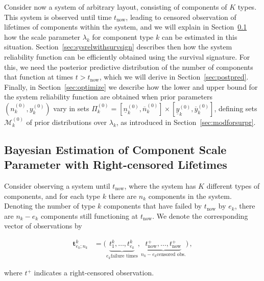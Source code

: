 \documentclass[Journal,SectionNumbers,InsideFigs]{ascelike}
\renewcommand{\vec}[1]{{\bm#1}}
\newcommand{\uz}{^{(0)}} %
\newcommand{\ul}[1]{\underline{#1}}
\newcommand{\ol}[1]{\overline{#1}}
\def\ykz{y\uz_k}
\def\ykzl{\ul{y}\uz_k}
\def\ykzu{\ol{y}\uz_k}
\def\nkz{n\uz_k}
\def\nkzl{\ul{n}\uz_k}
\def\nkzu{\ol{n}\uz_k}
\def\MkZ{\mathcal{M}\uz_k}
\def\PkZ{\Pi\uz_k}
\def\tnow{t_\text{now}}
\def\tpnow{t^+_\text{now}}
\begin{document}
Consider now a system of arbitrary layout,
consisting of components of $K$ types.
This system is observed until time $\tnow$,
leading to censored observation of lifetimes of components within the system,
and we will explain in Section~\ref{sec:lambdawithcens}
how the scale parameter $\lambda_k$ for component type $k$
can be estimated in this situation.
%
Section~\ref{sec:sysrelwithsurvsign} describes then
how the system reliability function can be efficiently obtained using the survival signature.
%
For this, we need the posterior predictive distribution
of the number of components that function at times $t > \tnow$,
which we will derive in Section~\ref{sec:postpred}.
%
Finally, in Section~\ref{sec:optimize} we describe how
the lower and upper bound for the system reliability function
are obtained when prior parameters $(\nkz,\ykz)$
vary in sets $\PkZ = [\nkzl,\nkzu] \times [\ykzl,\ykzu]$,
defining sets $\MkZ$ of prior distributions over $\lambda_k$,
as introduced in Section~\ref{sec:modforsurpr}.


\subsection{Bayesian Estimation of Component Scale Parameter with Right-censored Lifetimes}
\label{sec:lambdawithcens}

Consider observing a system until $\tnow$,
where the system has $K$ different types of components,
and for each type $k$ there are $n_k$ components in the system.
Denoting the number of type $k$ components that have failed by $\tnow$ by $e_k$,
there are $n_k - e_k$ components still functioning at $\tnow$.
We denote the corresponding vector of observations by
\begin{linenomath*}
\begin{align}
\vec{t}^k_{e_k;n_k} &= \big( \underbrace{t^k_1, \ldots, t^k_{e_k}}_{e_k \text{failure times}},
                             \underbrace{\tpnow, \ldots, \tpnow}_{n_k-e_k \text{censored obs.}} \big)\,,
\end{align}
\end{linenomath*}
where $t^+$ indicates a right-censored observation.
%
\end{document}
